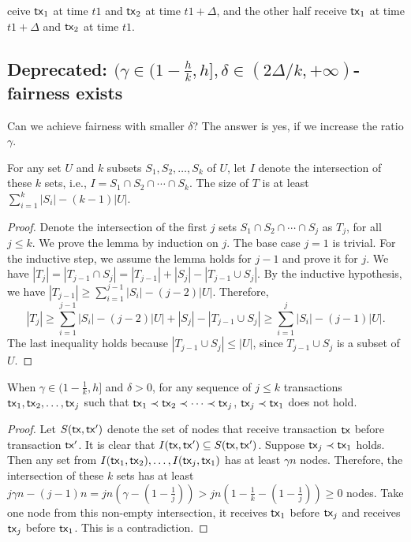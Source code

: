 \documentclass[runningheads]{llncs}
\begin{document}
ceive $\mathsf{tx}_1$ at time $t1$ and $\mathsf{tx}_2$ at time $t1+\Delta$, and the other half receive $\mathsf{tx}_1$ at time $t1+\Delta$ and $\mathsf{tx}_2$ at time $t1$. 

\subsection{Deprecated: $(\gamma\in(1-\frac{h}{k}, h], \delta\in (2\Delta/k, +\infty)$-fairness exists}
Can we achieve fairness with smaller $\delta$? The answer is yes, if we increase the ratio $\gamma$. 

\begin{lemma}\label{lemma:intersect}
    For any set $U$ and $k$ subsets $S_1, S_2, \dots, S_k$ of $U$, let $I$ denote the intersection of these $k$ sets, i.e., $I = S_1\cap S_2\cap \cdots \cap S_k$. The size of $T$ is at least $\sum_{i=1}^k |S_i| - (k-1)|U|$. 
\end{lemma}

\begin{proof}
    Denote the intersection of the first $j$ sets $S_1\cap S_2\cap\cdots \cap S_j$ as $T_j$, for all $j\le k$. We prove the lemma by induction on $j$. The base case $j=1$ is trivial. For the inductive step, we assume the lemma holds for $j-1$ and prove it for $j$. We have $|T_j| = |T_{j-1}\cap S_j| = |T_{j-1}| + |S_j| - |T_{j-1}\cup S_j|$. By the inductive hypothesis, we have $|T_{j-1}| \ge \sum_{i=1}^{j-1} |S_i| - (j-2)|U|$. Therefore,
    \[|T_j| \ge \sum_{i=1}^{j-1} |S_i| - (j-2)|U| + |S_j| - |T_{j-1}\cup S_j| \ge \sum_{i=1}^{j} |S_i| - (j-1)|U|.\]
    The last inequality holds because $|T_{j-1}\cup S_j|\le |U|$, since $T_{j-1}\cup S_j$ is a subset of $U$.  
\end{proof}

\begin{lemma} \label{lemma:in-k}
When $\gamma\in (1-\frac{1}{k}, h]$ and $\delta > 0$, for any sequence of $j\le k$ transactions $\mathsf{tx}_1, \mathsf{tx}_2, \dots, \mathsf{tx}_{j}$ such that $\mathsf{tx}_1\prec \mathsf{tx}_2\prec \cdots \prec \mathsf{tx}_{j}$, $\mathsf{tx}_{j}\prec \mathsf{tx}_1$ does not hold. 
\end{lemma}

\begin{proof}
    Let $S(\mathsf{tx}, \mathsf{tx}')$ denote the set of nodes that receive transaction $\mathsf{tx}$ before transaction $\mathsf{tx}'$. It is clear that $I(\mathsf{tx}, \mathsf{tx}')\subseteq S(\mathsf{tx}, \mathsf{tx}')$. Suppose $\mathsf{tx}_j\prec\mathsf{tx}_1$ holds. Then any set from $I(\mathsf{tx}_1,\mathsf{tx}_2), \dots, I(\mathsf{tx}_{j}, \mathsf{tx}_{1})$ has at least $\gamma n$ nodes. Therefore, the intersection of these $k$ sets has at least $j\gamma n - (j-1) n = jn(\gamma - (1-\frac{1}{j})) > jn(1-\frac{1}{k} - (1-\frac{1}{j})) \ge 0$ nodes. Take one node from this non-empty intersection, it receives $\mathsf{tx}_1$ before $\mathsf{tx}_j$ and receives $\mathsf{tx}_j$ before $\mathsf{tx}_1$. This is a contradiction. 
\end{proof}
\end{document}
